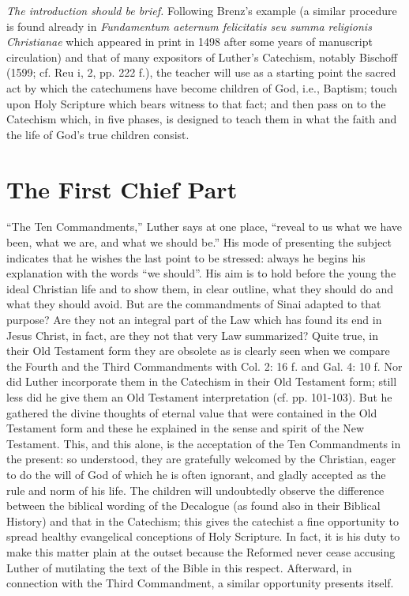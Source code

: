 \emph{The introduction should be brief.} Following Brenz’s example (a similar procedure is found already in \emph{Fundamentum aeternum felicitatis seu summa religionis Christianae} which appeared in print in 1498 after some years of manuscript circulation) and that of many expositors of Luther’s Catechism, notably Bischoff (1599; cf. Reu i, 2, pp. 222 f.), the teacher will use as a starting point the sacred act by which the catechumens have become children of God, i.e., Baptism; touch upon Holy Scripture which bears witness to that fact; and then pass on to the Catechism which, in five phases, is designed to teach them in what the faith and the life of God’s true children consist.

\section{The First Chief Part}

“The Ten Commandments,” Luther says at one place, “reveal to us what we have been, what we are, and what we should be.” His mode of presenting the subject indicates that he wishes the last point to be stressed: always he begins his explanation with the words “we should”. His aim is to hold before the young the ideal Christian life and to show them, in clear outline, what they should do and what they should avoid. But are the commandments of Sinai adapted to that purpose? Are they not an integral part of the Law which has found its end in Jesus Christ, in fact, are they not that very Law summarized? Quite true, in their Old Testament form they are obsolete as is clearly seen when we compare the Fourth and the Third Commandments with Col. 2: 16 f. and Gal. 4: 10 f. Nor did Luther incorporate them in the Catechism in their Old Testament form; still less did he give them an Old Testament interpretation (cf. pp. 101-103). But he gathered the divine thoughts of eternal value that were contained in the Old Testament form and these he explained in the sense
and spirit of the New Testament. This, and this alone, is the acceptation of the Ten Commandments in the present: so understood, they are gratefully welcomed by the Christian, eager to do the will of God of which he is often ignorant, and gladly accepted as the rule and norm of his life. The children will undoubtedly observe the difference between the biblical wording of the Decalogue (as found also in their Biblical History) and that in the Catechism; this gives the catechist a fine opportunity to spread healthy evangelical conceptions of Holy Scripture. In fact, it is his duty to make this matter plain at the outset because the Reformed never cease accusing Luther of mutilating the text of the Bible in this respect. Afterward, in connection with the Third Commandment, a similar opportunity presents itself.

